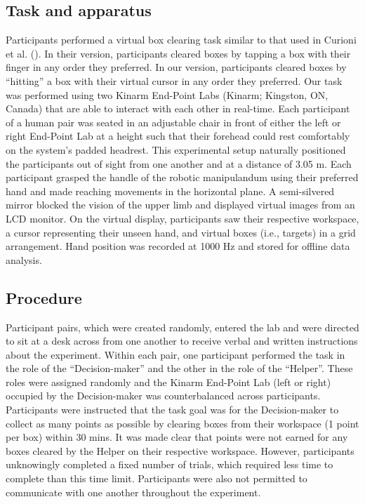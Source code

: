 \documentclass[
  man,
  floatsintext,
  longtable,
  nolmodern,
  notxfonts,
  notimes,
  colorlinks=true,linkcolor=blue,citecolor=blue,urlcolor=blue]{apa7}
\begin{document}
\subsection{Task and apparatus}\label{task-and-apparatus}

Participants performed a virtual box clearing task similar to that used
in Curioni et al. (). In their version,
participants cleared boxes by tapping a box with their finger in any
order they preferred. In our version, participants cleared boxes by
``hitting'' a box with their virtual cursor in any order they preferred.
Our task was performed using two Kinarm End-Point Labs (Kinarm;
Kingston, ON, Canada) that are able to interact with each other in
real-time. Each participant of a human pair was seated in an adjustable
chair in front of either the left or right End-Point Lab at a height
such that their forehead could rest comfortably on the system's padded
headrest. This experimental setup naturally positioned the participants
out of sight from one another and at a distance of 3.05 m. Each
participant grasped the handle of the robotic manipulandum using their
preferred hand and made reaching movements in the horizontal plane. A
semi-silvered mirror blocked the vision of the upper limb and displayed
virtual images from an LCD monitor. On the virtual display, participants
saw their respective workspace, a cursor representing their unseen hand,
and virtual boxes (i.e., targets) in a grid arrangement. Hand position
was recorded at 1000 Hz and stored for offline data analysis.

\subsection{Procedure}\label{procedure}

Participant pairs, which were created randomly, entered the lab and were
directed to sit at a desk across from one another to receive verbal and
written instructions about the experiment. Within each pair, one
participant performed the task in the role of the ``Decision-maker'' and
the other in the role of the ``Helper''. These roles were assigned
randomly and the Kinarm End-Point Lab (left or right) occupied by the
Decision-maker was counterbalanced across participants. Participants
were instructed that the task goal was for the Decision-maker to collect
as many points as possible by clearing boxes from their workspace (1
point per box) within 30 mins. It was made clear that points were not
earned for any boxes cleared by the Helper on their respective
workspace. However, participants unknowingly completed a fixed number of
trials, which required less time to complete than this time limit.
Participants were also not permitted to communicate with one another
throughout the experiment.
\end{document}
